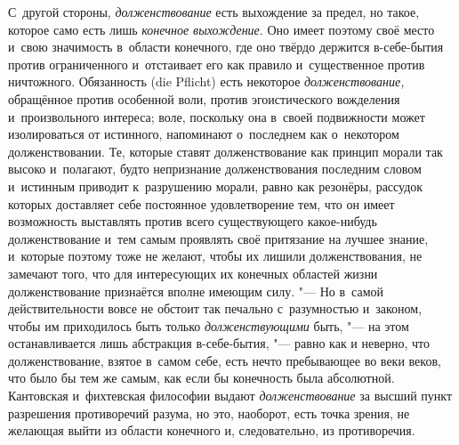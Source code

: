С~другой стороны, {\em долженствование} есть выхождение
за предел, но такое, которое само есть лишь
{\em конечное выхождение}. Оно имеет поэтому своё место
и~свою значимость в~области конечного, где оно твёрдо держится в-себе-бытия
против ограниченного и~отстаивает его как правило и~существенное против
ничтожного. Обязанность (die Pflicht) есть некоторое
{\em долженствование,} обращённое против особенной
воли, против эгоистического вожделения и~произвольного интереса; воле,
поскольку она в~своей подвижности может изолироваться от истинного,
напоминают о~последнем как о~некотором долженствовании. Те, которые ставят
долженствование как принцип морали так высоко и~полагают, будто непризнание
долженствования последним словом и~истинным приводит к~разрушению морали,
равно как резонёры, рассудок которых доставляет себе постоянное
удовлетворение тем, что он имеет возможность выставлять против всего
существующего какое-нибудь долженствование и~тем самым проявлять своё
притязание на лучшее знание, и~которые поэтому тоже не желают, чтобы их лишили
долженствования, не замечают того, что для интересующих их конечных
областей жизни долженствование признаётся вполне имеющим силу. "--- Но в~самой
действительности вовсе не обстоит так печально с~разумностью и~законом,
чтобы им приходилось быть только {\em долженствующими}
быть, "--- на этом останавливается лишь абстракция в-себе-бытия, "--- равно как и
неверно, что долженствование, взятое в~самом себе, есть нечто пребывающее
во веки веков, что было бы тем же самым, как если бы конечность была
абсолютной. Кантовская и~фихтевская философии выдают
{\em долженствование} за высший пункт разрешения
противоречий разума, но это, наоборот, есть точка зрения, не желающая выйти
из области конечного и, следовательно, из противоречия.

\label{ssssec:gamma}

